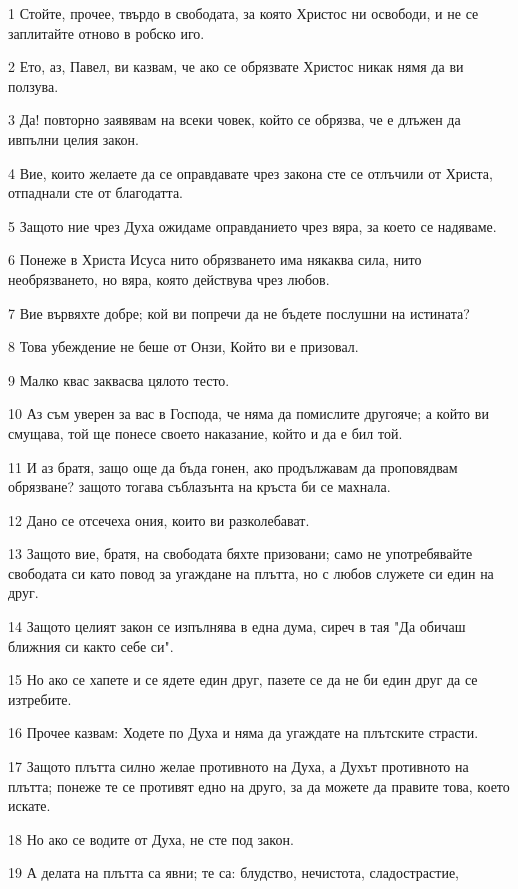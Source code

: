 \par 1 Стойте, прочее, твърдо в свободата, за която Христос ни освободи, и не се заплитайте отново в робско иго.
\par 2 Ето, аз, Павел, ви казвам, че ако се обрязвате Христос никак нямя да ви ползува.
\par 3 Да! повторно заявявам на всеки човек, който се обрязва, че е длъжен да ивпълни целия закон.
\par 4 Вие, които желаете да се оправдавате чрез закона сте се отлъчили от Христа, отпаднали сте от благодатта.
\par 5 Защото ние чрез Духа ожидаме оправданието чрез вяра, за което се надяваме.
\par 6 Понеже в Христа Исуса нито обрязването има някаква сила, нито необрязването, но вяра, която действува чрез любов.
\par 7 Вие вървяхте добре; кой ви попречи да не бъдете послушни на истината?
\par 8 Това убеждение не беше от Онзи, Който ви е призовал.
\par 9 Малко квас заквасва цялото тесто.
\par 10 Аз съм уверен за вас в Господа, че няма да помислите другояче; а който ви смущава, той ще понесе своето наказание, който и да е бил той.
\par 11 И аз братя, защо още да бъда гонен, ако продължавам да проповядвам обрязване? защото тогава съблазънта на кръста би се махнала.
\par 12 Дано се отсечеха ония, които ви разколебават.
\par 13 Защото вие, братя, на свободата бяхте призовани; само не употребявайте свободата си като повод за угаждане на плътта, но с любов служете си един на друг.
\par 14 Защото целият закон се изпълнява в една дума, сиреч в тая "Да обичаш ближния си както себе си".
\par 15 Но ако се хапете и се ядете един друг, пазете се да не би един друг да се изтребите.
\par 16 Прочее казвам: Ходете по Духа и няма да угаждате на плътските страсти.
\par 17 Защото плътта силно желае противното на Духа, а Духът противното на плътта; понеже те се противят едно на друго, за да можете да правите това, което искате.
\par 18 Но ако се водите от Духа, не сте под закон.
\par 19 А делата на плътта са явни; те са: блудство, нечистота, сладострастие,
